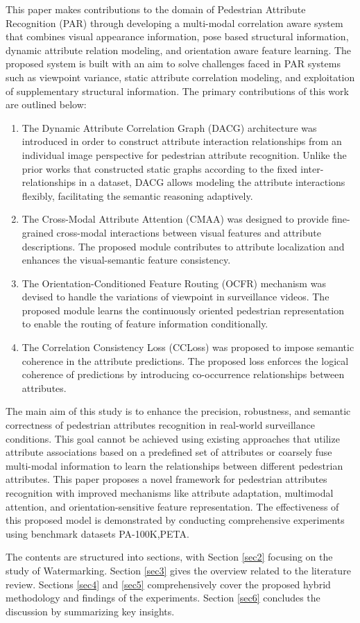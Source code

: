 \documentclass{ieeeaccess}
\begin{document}
This paper makes contributions to the domain of Pedestrian Attribute Recognition (PAR) through developing a multi-modal correlation aware system that combines visual appearance information, pose based structural information, dynamic attribute relation modeling, and orientation aware feature learning. The proposed system is built with an aim to solve challenges faced in PAR systems such as viewpoint variance, static attribute correlation modeling, and exploitation of supplementary structural information. The primary contributions of this work are outlined below:
\begin{enumerate}

    \item The Dynamic Attribute Correlation Graph (DACG) architecture was introduced in order to construct attribute interaction relationships from an individual image perspective for pedestrian attribute recognition. Unlike the prior works that constructed static graphs according to the fixed inter-relationships in a dataset, DACG allows modeling the attribute interactions flexibly, facilitating the semantic reasoning adaptively.
    \item The Cross-Modal Attribute Attention (CMAA) was designed to provide fine-grained cross-modal interactions between visual features and attribute descriptions. The proposed module contributes to attribute localization and enhances the visual-semantic feature consistency.
     \item The Orientation-Conditioned Feature Routing (OCFR) mechanism was devised to handle the variations of viewpoint in surveillance videos. The proposed module learns the continuously oriented pedestrian representation to enable the routing of feature information conditionally.
     \item The Correlation Consistency Loss (CCLoss) was proposed to impose semantic coherence in the attribute predictions. The proposed loss enforces the logical coherence of predictions by introducing co-occurrence relationships between attributes.
\end{enumerate}

The main aim of this study is to enhance the precision, robustness, and semantic correctness of pedestrian attributes recognition in real-world surveillance conditions. This goal cannot be achieved using existing approaches that utilize attribute associations based on a predefined set of attributes or coarsely fuse multi-modal information to learn the relationships between different pedestrian attributes. This paper proposes a novel framework for pedestrian attributes recognition with improved mechanisms like attribute adaptation, multimodal attention, and orientation-sensitive feature representation. The effectiveness of this proposed model is demonstrated by conducting comprehensive experiments using benchmark datasets PA-100K,PETA.
\par The contents are structured into sections, with Section \ref{sec2} focusing on the study of Watermarking. Section \ref{sec3} gives the overview related to the literature review. Sections \ref{sec4} and \ref{sec5} comprehensively cover the proposed hybrid methodology and findings of the experiments. Section \ref{sec6} concludes the discussion by summarizing key insights.
\end{document}
